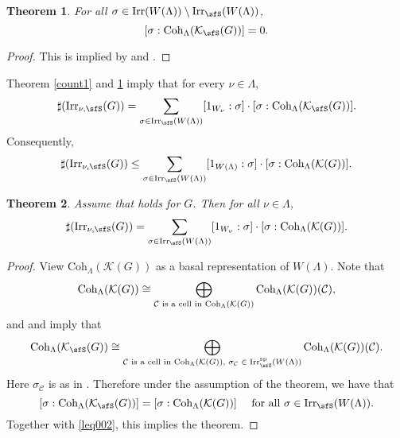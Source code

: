 \documentclass[12pt,a4paper]{amsart}
\def\subset{\subseteq}
\newcommand{\CC}{{\mathcal {C}}}
\newcommand{\CK}{{\mathcal {K}}}
\newcommand{\CO}{{\mathcal {O}}}
\newcommand{\CV}{{\mathcal {V}}}
\newcommand{\be}{\begin {equation}}
\newcommand{\ee}{\end {equation}}
\numberwithin{equation}{section}
\newtheorem{thm}{Theorem}[section]
\theoremstyle{remark}
\def\Irr{\mathrm{Irr}}
\def\Coh{\mathrm{Coh}}
\providecommand{\nsubset}{\not\subset}
\newcommand{\Lam}{{[\lambda]}}
\begin{document}
\begin{thm}\label{count2}
For all $\sigma\in \Irr(W(\Lambda))\setminus \Irr_\sfS(W(\Lambda))$,  %
  \[
    [\sigma:\Coh_{\Lambda}(\CK_\sfS(G))]=0.
  \]

\end{thm}
\begin{proof}
This is implied by  and .
\end{proof}


Theorem \ref{count1} and \ref{count2} imply that  for every $\nu\in \Lambda$,
\begin{equation}\label{leq002}
  \sharp(\Irr_{\nu,\sfS}(G)) = \sum_{\sigma \in \Irr_\sfS(W(\Lambda))} [1_{W_{\nu}}: \sigma]\cdot [\sigma:\Coh_{\Lambda}(\CK_\sfS(G))].
  \end{equation}
Consequently,
\begin{equation}\label{leq2}  \sharp(\Irr_{\nu,\sfS}(G)) \leq  \sum_{\sigma \in \Irr_\sfS(W(\Lambda))} [1_{W(\Lambda)}: \sigma]\cdot [\sigma:\Coh_{\Lambda}(\CK(G))].
\end{equation}



 \begin{thm}\label{counteq}
   Assume that  holds for $G$. Then for all $\nu\in \Lambda$,
  \begin{equation*}%
    \sharp(\Irr_{\nu,\sfS}(G)) = \sum_{\sigma \in \Irr_\sfS(W(\Lambda))} [1_{W_\nu}: \sigma]\cdot [\sigma:\Coh_{\Lambda}(\CK(G))].
  \end{equation*}
    \end{thm}

\begin{proof}
View  $\Coh_{\Lambda}(\CK(G))$ as a basal representation of $W(\Lambda)$. Note that
\[
  \Coh_{\Lambda}(\CK(G))\\
   \cong \bigoplus_{\CC \textrm{ is a cell in $\Coh_{\Lambda}(\CK(G))$}} \Coh_{\Lambda}(\CK(G))(\CC),
\]
and
  and   imply that
 \[
   \Coh_{\Lambda}(\CK_\sfS(G))\cong  \bigoplus_{\CC \textrm{ is a cell in $\Coh_{\Lambda}(\CK(G))$, $\sigma_\CC\in \Irr^{\mathrm{sp}}_\sfS(W(\Lambda))$}} \Coh_{\Lambda}(\CK(G))(\CC).
 \]
 Here $\sigma_\CC$ is as in . Therefore under the assumption of the theorem, we have that
\be\label{eqsigma}
[ \sigma: \Coh_{\Lambda}(\CK_\sfS(G))]=[\sigma:\Coh_{\Lambda}(\CK(G))]\quad \textrm{ for all  $\sigma\in \Irr_\sfS(W(\Lambda))$.}
\ee
 Together with \eqref{leq002}, this implies the theorem.
\end{proof}
\end{document}
